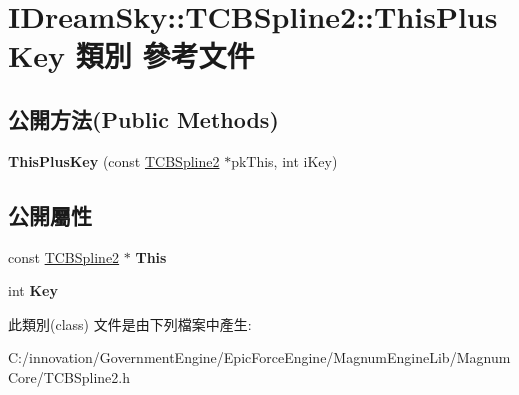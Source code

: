 \hypertarget{class_i_dream_sky_1_1_t_c_b_spline2_1_1_this_plus_key}{}\section{I\+Dream\+Sky\+:\+:T\+C\+B\+Spline2\+:\+:This\+Plus\+Key 類別 參考文件}
\label{class_i_dream_sky_1_1_t_c_b_spline2_1_1_this_plus_key}
\subsection*{公開方法(Public Methods)}
\begin{DoxyCompactItemize}
\item 
{\bfseries This\+Plus\+Key} (const \hyperlink{class_i_dream_sky_1_1_t_c_b_spline2}{T\+C\+B\+Spline2} $\ast$pk\+This, int i\+Key)\hypertarget{class_i_dream_sky_1_1_t_c_b_spline2_1_1_this_plus_key_a0d20a812e0dd5f4adf7af814f46626ea}{}\label{class_i_dream_sky_1_1_t_c_b_spline2_1_1_this_plus_key_a0d20a812e0dd5f4adf7af814f46626ea}

\end{DoxyCompactItemize}
\subsection*{公開屬性}
\begin{DoxyCompactItemize}
\item 
const \hyperlink{class_i_dream_sky_1_1_t_c_b_spline2}{T\+C\+B\+Spline2} $\ast$ {\bfseries This}\hypertarget{class_i_dream_sky_1_1_t_c_b_spline2_1_1_this_plus_key_ae8e8c5ced5d563c06809a84bc65ddbb2}{}\label{class_i_dream_sky_1_1_t_c_b_spline2_1_1_this_plus_key_ae8e8c5ced5d563c06809a84bc65ddbb2}

\item 
int {\bfseries Key}\hypertarget{class_i_dream_sky_1_1_t_c_b_spline2_1_1_this_plus_key_a2540527726cb679a50a447382e2dca0f}{}\label{class_i_dream_sky_1_1_t_c_b_spline2_1_1_this_plus_key_a2540527726cb679a50a447382e2dca0f}

\end{DoxyCompactItemize}


此類別(class) 文件是由下列檔案中產生\+:\begin{DoxyCompactItemize}
\item 
C\+:/innovation/\+Government\+Engine/\+Epic\+Force\+Engine/\+Magnum\+Engine\+Lib/\+Magnum\+Core/T\+C\+B\+Spline2.\+h\end{DoxyCompactItemize}
